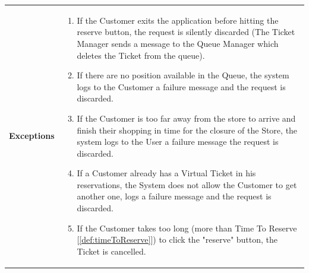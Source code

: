 \documentclass[a4paper, 12pt, oneside]{article}
\begin{document}
\begin{tabularx}{\linewidth}{| l | X |}
	\hline
	\textbf{Exceptions} & \parbox{0.7\textwidth}{ \begin{enumerate}
			\item If the Customer exits the application before hitting the reserve button, the request is silently discarded (The Ticket Manager sends a message to the Queue Manager which deletes the Ticket from the queue).
			\item If there are no position available in the Queue, the system logs to the Customer a failure message and the request is discarded.
			\item If the Customer is too far away from the store to arrive and finish their shopping in time for the closure of the Store, the system logs to the User a failure message the request is discarded.
			\item If a Customer already has a Virtual Ticket in his reservations, the System does not allow the Customer to get another one, logs a failure message and the request is discarded.
			\item If the Customer takes too long (more than Time To Reserve [\ref{def:timeToReserve}]) to click the "reserve" button, the Ticket is cancelled.
		\end{enumerate}}\\

	\hline
	
\end{tabularx}
\end{document}
